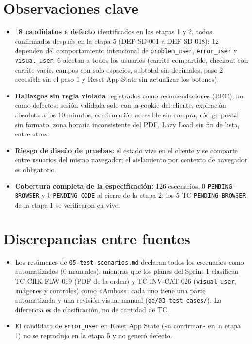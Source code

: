 \documentclass[10pt,a4paper]{article}
\begin{document}
\section{Observaciones clave}
\begin{itemize}
  \item \textbf{18 candidatos a defecto} identificados en las etapas 1 y 2, todos confirmados después en la etapa 5 (DEF-SD-001 a DEF-SD-018): 12 dependen del comportamiento intencional de \texttt{problem\_user}, \texttt{error\_user} y \texttt{visual\_user}; 6 afectan a todos los usuarios (carrito compartido, checkout con carrito vacío, campos con solo espacios, subtotal sin decimales, paso 2 accesible sin el paso 1 y Reset App State sin actualizar los botones).
  \item \textbf{Hallazgos sin regla violada} registrados como recomendaciones (REC), no como defectos: sesión validada solo con la cookie del cliente, expiración absoluta a los 10 minutos, confirmación accesible sin compra, código postal sin formato, zona horaria inconsistente del PDF, Lazy Load sin fin de lista, entre otros.
  \item \textbf{Riesgo de diseño de pruebas:} el estado vive en el cliente y se comparte entre usuarios del mismo navegador; el aislamiento por contexto de navegador es obligatorio.
  \item \textbf{Cobertura completa de la especificación:} 126 escenarios, 0 \texttt{PENDING-BROWSER} y 0 \texttt{PENDING-CODE} al cierre de la etapa 2; los 5 TC \texttt{PENDING-BROWSER} de la etapa 1 se verificaron en vivo.
\end{itemize}

\section{Discrepancias entre fuentes}
\begin{itemize}
  \item Los resúmenes de \texttt{05-test-scenarios.md} declaran todos los escenarios como automatizados (0 manuales), mientras que los planes del Sprint 1 clasifican TC-CHK-FLW-019 (PDF de la orden) y TC-INV-CAT-026 (\texttt{visual\_user}, imágenes y controles) como «Ambos»: cada uno tiene una parte automatizada y una revisión visual manual (\texttt{qa/03-test-cases/}). La diferencia es de clasificación, no de cantidad de TC.
  \item El candidato de \texttt{error\_user} en Reset App State («a confirmar» en la etapa 1) no se reprodujo en la etapa 5 y no generó defecto.
\end{itemize}
\end{document}
